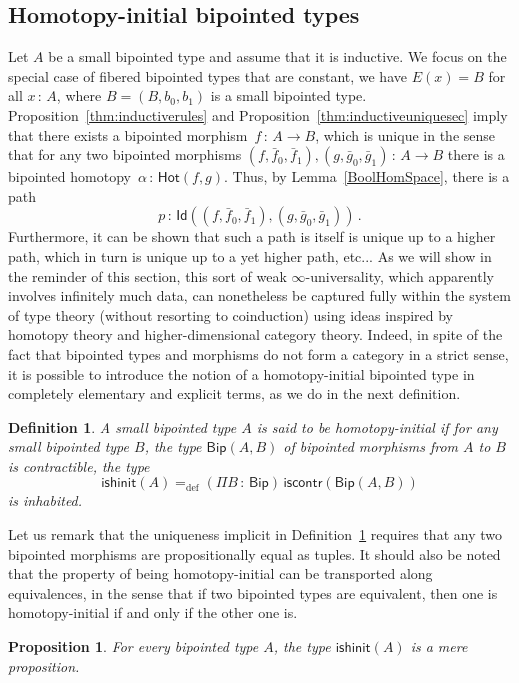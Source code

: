 \documentclass[10pt,a4paper,oneside,reqno]{amsart}
\numberwithin{equation}{section}
\theoremstyle{mythm}
\newtheorem{proposition}[theorem]{Proposition}
\theoremstyle{mydef}
\newtheorem{definition}[theorem]{Definition}
\theoremstyle{myrmk}
\newcommand{\ie}{\text{i.e.\ }}
\newcommand{\defeq}{=_{\mathrm{def}}}
\newcommand{\co}{\,{:}\,}
\newcommand{\iscontr}{\mathsf{iscontr}}
\newcommand{\ishinit}{\mathsf{ishinit}}
\newcommand{\Hot}{\mathsf{Hot}}
\newcommand{\Id}{\mathsf{Id}}
\newcommand{\Bip}{\mathsf{Bip}}
\newcommand{\BipHom}{\mathsf{Bip}}
\begin{document}
\subsection*{Homotopy-initial bipointed types} 
 Let $A$ be a small bipointed type and assume that it is inductive. 
 We focus on the special case of fibered bipointed types that 
are constant, \ie we have $E(x) = B$ for all $x \co A$, where $B = (B, b_0, b_1)$  is
a small bipointed type. 
 Proposition~\ref{thm:inductiverules} and Proposition~\ref{thm:inductiveuniquesec}
imply that there exists a bipointed morphism~$f \co A \to B$, which is unique in the sense that  for any two bipointed morphisms $(f, \bar{f}_0, \bar{f}_1), (g, \bar{g}_0, \bar{g}_1) \co A \to B$  there is a bipointed 
homotopy~$\alpha \co \Hot(f, g)$. Thus, by Lemma~\ref{BoolHomSpace}, there is a path 
\[
p \co \Id((f, \bar{f}_0, \bar{f}_1), (g, \bar{g}_0, \bar{g}_1)) \, .
\] 
Furthermore, it can be shown that such a path is itself is unique up to a higher path, which in turn is unique up to a yet higher path, etc... As we will show in the reminder of this section, this sort of weak $\infty$-universality, which apparently involves infinitely much data, can nonetheless be captured fully within the system of type theory (without resorting to coinduction) using ideas inspired by homotopy theory and higher-dimensional category theory. Indeed, in spite of the fact that bipointed types and morphisms do not form a category in a strict sense, it is possible to introduce the  notion of a homotopy-initial bipointed type in completely elementary and explicit terms, as we do in the next definition.


\begin{definition}\label{def:BoolInit}
A small bipointed type $A$ is said to be \emph{homotopy-initial}  if for any small bipointed type $B$, the type $\BipHom(A,B)$ of bipointed morphisms from $A$ to $B$
is contractible, \ie the type
\[
\ishinit(A) \defeq (\Pi B \co \Bip) \, \iscontr(\BipHom(A, B) )
\] 
is inhabited.
\end{definition}

Let us remark that the uniqueness implicit in Definition~\ref{def:BoolInit} requires that any two bipointed morphisms are propositionally equal as tuples. It should also be noted that the property of being  homotopy-initial  can be transported along equivalences, in the sense that if two bipointed types are equivalent, then one is homotopy-initial if and only if the other one is.  

\begin{proposition} \label{thm:isbiphinitishprop} For every bipointed type $A$, the type $\ishinit(A)$ is a mere proposition.
\end{proposition}
\end{document}
